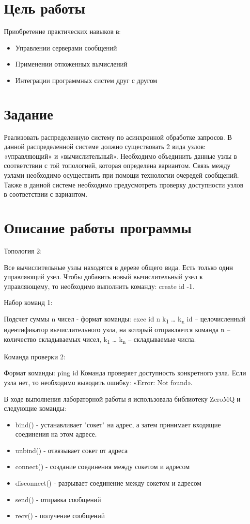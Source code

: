 \documentclass[a4paper, 12pt]{article}
\begin{document}
\section{Цель работы}
Приобретение практических навыков в:
\begin{itemize}
  \item Управлении серверами сообщений
  \item Применении отложенных вычислений
  \item Интеграции программных систем друг с другом
\end{itemize}

\section{Задание}
Реализовать распределенную систему по асинхронной обработке запросов. В данной распределенной системе должно существовать 2 вида узлов: «управляющий» и «вычислительный». Необходимо объединить данные узлы в соответствии с той топологией, которая определена вариантом. Связь между узлами необходимо осуществить при помощи технологии очередей сообщений. Также в данной системе необходимо предусмотреть проверку доступности узлов в соответствии с вариантом.

\section{Описание работы программы}
Топология 2:

Все вычислительные узлы находятся в дереве общего вида. Есть только один управляющий узел. Чтобы добавить новый вычислительный узел к управляющему, то необходимо выполнить команду: create id -1.

Набор команд 1:

Подсчет суммы n чисел - формат команды: exec id n k\textsubscript{1} … k\textsubscript{n} id – целочисленный идентификатор вычислительного узла, на который отправляется команда n – количество складываемых чисел, k\textsubscript{1} … k\textsubscript{n} – складываемые числа.

Команда проверки 2:

Формат команды: ping id Команда проверяет доступность конкретного узла. Если узла нет, то необходимо выводить ошибку: «Error: Not found».

В ходе выполнения лабораторной работы я использовала библиотеку ZeroMQ и следующие команды:
\begin{itemize}
  \item bind() - устанавливает "сокет" на адрес, а затем принимает входящие соединения на этом адресе.
  \item unbind() - отвязывает сокет от адреса
  \item connect() - создание соединения между сокетом и адресом
  \item disconnect() - разрывает соединение между сокетом и адресом
  \item send() - отправка сообщений
  \item recv() - получение сообщений
\end{itemize}
\end{document}
